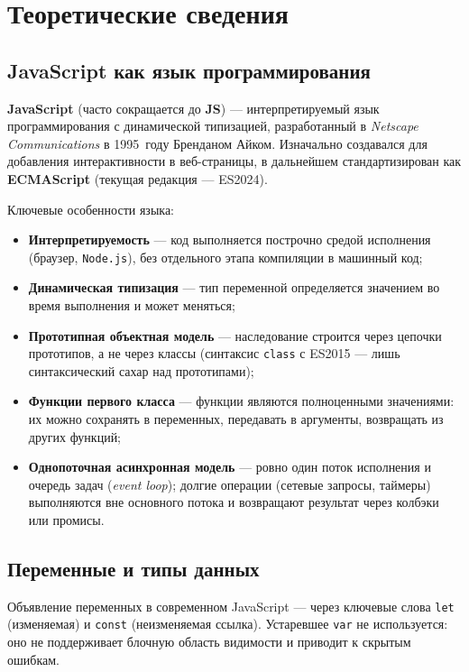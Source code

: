 \chapter{Теоретические сведения}
\label{ch:theory}

\section{JavaScript как язык программирования}

\textbf{JavaScript} (часто сокращается до \textbf{JS}) --- интерпретируемый
язык программирования с динамической типизацией, разработанный в
\textit{Netscape Communications} в 1995~году Бренданом Айком. Изначально
создавался для добавления интерактивности в веб-страницы, в дальнейшем
стандартизирован как \textbf{ECMAScript} (текущая редакция --- ES2024).

Ключевые особенности языка:
\begin{itemize}
  \item \textbf{Интерпретируемость} --- код выполняется построчно
        средой исполнения (браузер, \texttt{Node.js}), без отдельного
        этапа компиляции в машинный код;
  \item \textbf{Динамическая типизация} --- тип переменной определяется
        значением во время выполнения и может меняться;
  \item \textbf{Прототипная объектная модель} --- наследование строится
        через цепочки прототипов, а не через классы (синтаксис
        \texttt{class} с ES2015 --- лишь синтаксический сахар над
        прототипами);
  \item \textbf{Функции первого класса} --- функции являются полноценными
        значениями: их можно сохранять в переменных, передавать в
        аргументы, возвращать из других функций;
  \item \textbf{Однопоточная асинхронная модель} --- ровно один поток
        исполнения и очередь задач (\textit{event loop}); долгие
        операции (сетевые запросы, таймеры) выполняются вне основного
        потока и возвращают результат через колбэки или промисы.
\end{itemize}

\section{Переменные и типы данных}

Объявление переменных в современном JavaScript --- через ключевые слова
\texttt{let} (изменяемая) и \texttt{const} (неизменяемая ссылка).
Устаревшее \texttt{var} не используется: оно не поддерживает блочную
область видимости и приводит к скрытым ошибкам.


